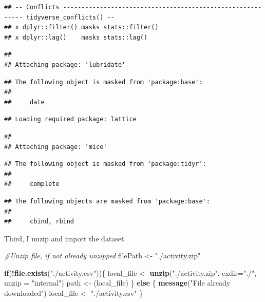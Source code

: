 \documentclass[]{article}
\newenvironment{Shaded}{\begin{snugshade}}{\end{snugshade}}
\newcommand{\KeywordTok}[1]{\textcolor[rgb]{0.13,0.29,0.53}{\textbf{#1}}}
\newcommand{\DataTypeTok}[1]{\textcolor[rgb]{0.13,0.29,0.53}{#1}}
\newcommand{\StringTok}[1]{\textcolor[rgb]{0.31,0.60,0.02}{#1}}
\newcommand{\CommentTok}[1]{\textcolor[rgb]{0.56,0.35,0.01}{\textit{#1}}}
\newcommand{\ControlFlowTok}[1]{\textcolor[rgb]{0.13,0.29,0.53}{\textbf{#1}}}
\newcommand{\OperatorTok}[1]{\textcolor[rgb]{0.81,0.36,0.00}{\textbf{#1}}}
\newcommand{\NormalTok}[1]{#1}
\begin{document}
\begin{verbatim}
## -- Conflicts ----------------------------------------------------------- tidyverse_conflicts() --
## x dplyr::filter() masks stats::filter()
## x dplyr::lag()    masks stats::lag()
\end{verbatim}

\begin{verbatim}
## 
## Attaching package: 'lubridate'
\end{verbatim}

\begin{verbatim}
## The following object is masked from 'package:base':
## 
##     date
\end{verbatim}

\begin{verbatim}
## Loading required package: lattice
\end{verbatim}

\begin{verbatim}
## 
## Attaching package: 'mice'
\end{verbatim}

\begin{verbatim}
## The following object is masked from 'package:tidyr':
## 
##     complete
\end{verbatim}

\begin{verbatim}
## The following objects are masked from 'package:base':
## 
##     cbind, rbind
\end{verbatim}

Third, I unzip and import the dataset.

\begin{Shaded}
\begin{Highlighting}[]
\CommentTok{#Unzip file, if not already unzipped }
\NormalTok{filePath <-}\StringTok{ "./activity.zip"}

\ControlFlowTok{if}\NormalTok{(}\OperatorTok{!}\KeywordTok{file.exists}\NormalTok{(}\StringTok{"./activity.csv"}\NormalTok{))\{}
\NormalTok{  local_file <-}\StringTok{ }\KeywordTok{unzip}\NormalTok{(}\StringTok{"./activity.zip"}\NormalTok{, }\DataTypeTok{exdir=}\StringTok{"./"}\NormalTok{, }\DataTypeTok{unzip =} \StringTok{"internal"}\NormalTok{)}
\NormalTok{  path <-}\StringTok{ }\NormalTok{(local_file)}
\NormalTok{\} }\ControlFlowTok{else}\NormalTok{ \{}
  \KeywordTok{message}\NormalTok{(}\StringTok{"File already downloaded"}\NormalTok{)}
\NormalTok{  local_file <-}\StringTok{ "./activity.csv"}
\NormalTok{\}}
\end{Highlighting}
\end{Shaded}
\end{document}
